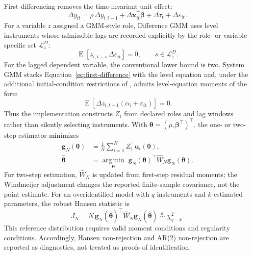 \documentclass[article]{jss}
\begin{document}
First differencing removes the time-invariant unit effect:
\begin{equation}
\label{eq:first-difference}
\Delta y_{it}
= \rho\,\Delta y_{i,t-1}
+ \Delta\mathbf{x}_{it}^\top\boldsymbol{\beta}
+ \Delta\tau_t + \Delta\varepsilon_{it}.
\end{equation}
For a variable $z$ assigned a GMM-style role, Difference GMM uses level instruments
whose admissible lags are recorded explicitly by the role- or variable-specific set
$\mathcal{L}_z^D$:
\begin{equation}
\label{eq:difference-moments}
\operatorname{E}\!\left[z_{i,t-s}\,\Delta\varepsilon_{it}\right]=0,
\qquad s\in\mathcal{L}_z^D.
\end{equation}
For the lagged dependent variable, the conventional lower bound is two. System GMM
stacks Equation~\ref{eq:first-difference} with the level equation and, under the
additional initial-condition restrictions of \citet{blundell1998initial}, admits
level-equation moments of the form
\begin{equation}
\label{eq:system-moments}
\operatorname{E}\!\left[\Delta z_{i,t-1}
  \left(\alpha_i+\varepsilon_{it}\right)\right]=0.
\end{equation}
Thus the implementation constructs $Z_i$ from declared roles and lag windows rather
than silently selecting instruments. With $\boldsymbol{\theta}=(\rho,\boldsymbol{\beta}^\top)^\top$,
the one- or two-step estimator minimizes
\begin{equation}
\label{eq:gmm-objective}
\begin{aligned}
\mathbf{g}_N(\boldsymbol{\theta})
  &= \frac{1}{N}\sum_{i=1}^N Z_i^\top
     \mathbf{u}_i(\boldsymbol{\theta}), \\
\widehat{\boldsymbol{\theta}}
  &= \underset{\boldsymbol{\theta}}{\operatorname{arg\,min}}\;
     \mathbf{g}_N(\boldsymbol{\theta})^\top
     \widehat{W}_N
     \mathbf{g}_N(\boldsymbol{\theta}).
\end{aligned}
\end{equation}
For two-step estimation, $\widehat{W}_N$ is updated from first-step residual moments;
the Windmeijer adjustment changes the reported finite-sample covariance, not the point
estimate. For an overidentified model with $q$ instruments and $k$ estimated parameters,
the robust Hansen statistic is
\begin{equation}
\label{eq:hansen}
J_N
= N\,\mathbf{g}_N(\widehat{\boldsymbol{\theta}})^\top
  \widehat{W}_N
  \mathbf{g}_N(\widehat{\boldsymbol{\theta}})
\;\overset{a}{\sim}\;\chi^2_{q-k}.
\end{equation}
This reference distribution requires valid moment conditions and regularity conditions.
Accordingly, Hansen non-rejection and AR(2) non-rejection are reported as diagnostics,
not treated as proofs of identification.
\end{document}
